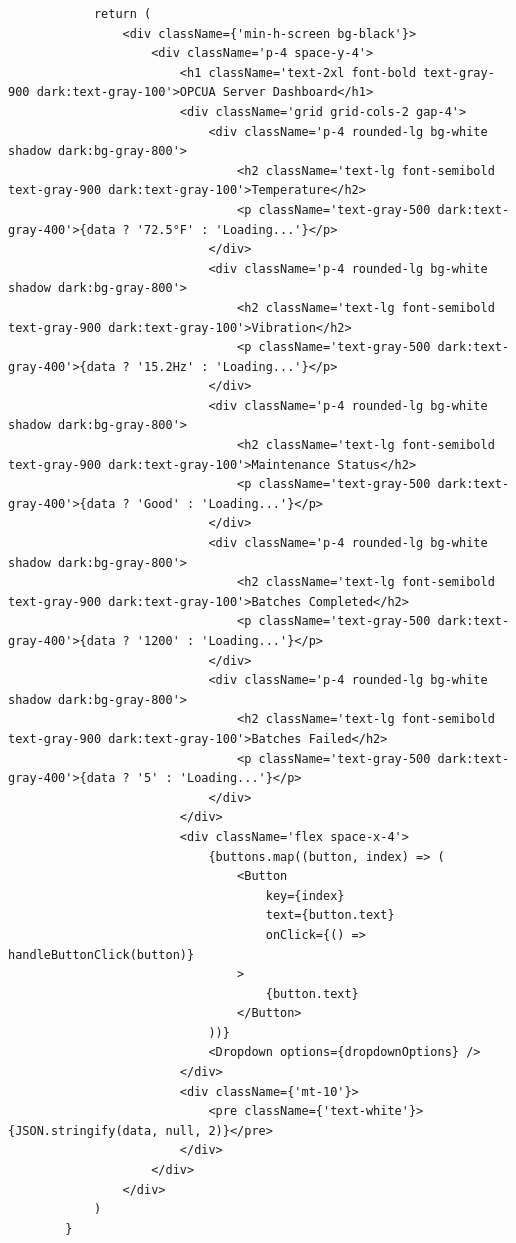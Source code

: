 \begin{center}
\begin{verbatim}
            return (
                <div className={'min-h-screen bg-black'}>
                    <div className='p-4 space-y-4'>
                        <h1 className='text-2xl font-bold text-gray-900 dark:text-gray-100'>OPCUA Server Dashboard</h1>
                        <div className='grid grid-cols-2 gap-4'>
                            <div className='p-4 rounded-lg bg-white shadow dark:bg-gray-800'>
                                <h2 className='text-lg font-semibold text-gray-900 dark:text-gray-100'>Temperature</h2>
                                <p className='text-gray-500 dark:text-gray-400'>{data ? '72.5°F' : 'Loading...'}</p>
                            </div>
                            <div className='p-4 rounded-lg bg-white shadow dark:bg-gray-800'>
                                <h2 className='text-lg font-semibold text-gray-900 dark:text-gray-100'>Vibration</h2>
                                <p className='text-gray-500 dark:text-gray-400'>{data ? '15.2Hz' : 'Loading...'}</p>
                            </div>
                            <div className='p-4 rounded-lg bg-white shadow dark:bg-gray-800'>
                                <h2 className='text-lg font-semibold text-gray-900 dark:text-gray-100'>Maintenance Status</h2>
                                <p className='text-gray-500 dark:text-gray-400'>{data ? 'Good' : 'Loading...'}</p>
                            </div>
                            <div className='p-4 rounded-lg bg-white shadow dark:bg-gray-800'>
                                <h2 className='text-lg font-semibold text-gray-900 dark:text-gray-100'>Batches Completed</h2>
                                <p className='text-gray-500 dark:text-gray-400'>{data ? '1200' : 'Loading...'}</p>
                            </div>
                            <div className='p-4 rounded-lg bg-white shadow dark:bg-gray-800'>
                                <h2 className='text-lg font-semibold text-gray-900 dark:text-gray-100'>Batches Failed</h2>
                                <p className='text-gray-500 dark:text-gray-400'>{data ? '5' : 'Loading...'}</p>
                            </div>
                        </div>
                        <div className='flex space-x-4'>
                            {buttons.map((button, index) => (
                                <Button
                                    key={index}
                                    text={button.text}
                                    onClick={() => handleButtonClick(button)}
                                >
                                    {button.text}
                                </Button>
                            ))}
                            <Dropdown options={dropdownOptions} />
                        </div>
                        <div className={'mt-10'}>
                            <pre className={'text-white'}>{JSON.stringify(data, null, 2)}</pre>
                        </div>
                    </div>
                </div>
            )
        }
    \end{verbatim}
\end{center}

